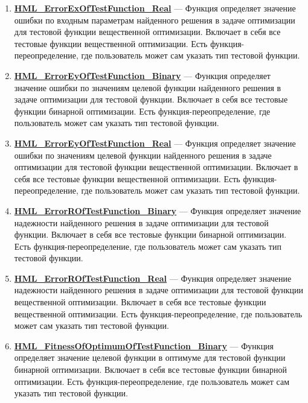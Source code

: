 \documentclass[a4paper,12pt]{article}
\begin{document}
\begin{enumerate}
\item \textbf{\hyperref[HML_ErrorExOfTestFunction_Real]{HML\_ErrorExOfTestFunction\_Real}} --- Функция определяет значение ошибки по входным параметрам найденного решения в задаче оптимизации для тестовой функции вещественной оптимизации. Включает в себя все тестовые функции вещественной оптимизации. Есть функция-переопределение, где пользователь может сам указать тип тестовой функции.

\item \textbf{\hyperref[HML_ErrorEyOfTestFunction_Binary]{HML\_ErrorEyOfTestFunction\_Binary}} --- Функция определяет значение ошибки по значениям целевой функции найденного решения в задаче оптимизации для тестовой функции. Включает в себя все тестовые функции бинарной оптимизации. Есть функция-переопределение, где пользователь может сам указать тип тестовой функции.

\item \textbf{\hyperref[HML_ErrorEyOfTestFunction_Real]{HML\_ErrorEyOfTestFunction\_Real}} --- Функция определяет значение ошибки по значениям целевой функции найденного решения в задаче оптимизации для тестовой функции вещественной оптимизации. Включает в себя все тестовые функции вещественной оптимизации. Есть функция-переопределение, где пользователь может сам указать тип тестовой функции.

\item \textbf{\hyperref[HML_ErrorROfTestFunction_Binary]{HML\_ErrorROfTestFunction\_Binary}} --- Функция определяет значение надежности найденного решения в задаче оптимизации для тестовой функции. Включает в себя все тестовые функции бинарной оптимизации. Есть функция-переопределение, где пользователь может сам указать тип тестовой функции.

\item \textbf{\hyperref[HML_ErrorROfTestFunction_Real]{HML\_ErrorROfTestFunction\_Real}} --- Функция определяет значение надежности найденного решения в задаче оптимизации для тестовой функции вещественной оптимизации. Включает в себя все тестовые функции  вещественной оптимизации. Есть функция-переопределение, где пользователь может сам указать тип тестовой функции.

\item \textbf{\hyperref[HML_FitnessOfOptimumOfTestFunction_Binary]{HML\_FitnessOfOptimumOfTestFunction\_Binary}} --- Функция определяет значение целевой функции в оптимуме для тестовой функции бинарной оптимизации. Включает в себя все тестовые функции бинарной оптимизации. Есть функция-переопределение, где пользователь может сам указать тип тестовой функции.


\end{enumerate}
\end{document}
